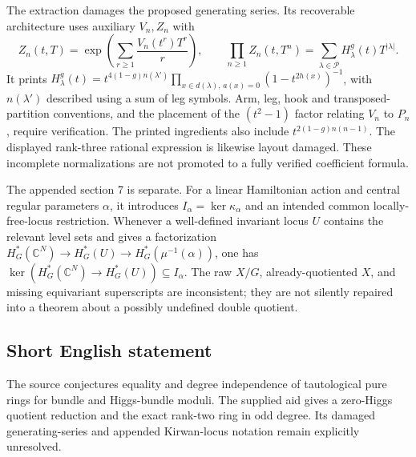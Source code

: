 \documentclass[11pt]{article}
\newcommand{\C}{\mathbb{C}}
\begin{document}
The extraction damages the proposed generating series. Its recoverable architecture uses auxiliary \(V_n,Z_n\) with
\[
Z_n(t,T)=\exp\left(\sum_{r\geq1}\frac{V_n(t^r)T^r}{r}\right),\qquad
\prod_{n\geq1}Z_n(t,T^n)=\sum_{\lambda\in\mathcal P}H^g_\lambda(t)T^{|\lambda|}.
\]
It prints \(H^g_\lambda(t)=t^{4(1-g)n(\lambda')}\prod_{x\in d(\lambda),\,a(x)=0}(1-t^{2h(x)})^{-1}\), with \(n(\lambda')\) described using a sum of leg symbols. Arm, leg, hook and transposed-partition conventions, and the placement of the \((t^2-1)\) factor relating \(V_n\) to \(P_n\), require verification. The printed ingredients also include \(t^{2(1-g)n(n-1)}\). The displayed rank-three rational expression is likewise layout damaged. These incomplete normalizations are not promoted to a fully verified coefficient formula.

The appended section 7 is separate. For a linear Hamiltonian action and central regular parameters \(\alpha\), it introduces \(I_\alpha=\ker\kappa_\alpha\) and an intended common locally-free-locus restriction. Whenever a well-defined invariant locus \(U\) contains the relevant level sets and gives a factorization \(H_G^*(\C^N)\to H_G^*(U)\to H_G^*(\mu^{-1}(\alpha))\), one has \(\ker(H_G^*(\C^N)\to H_G^*(U))\subseteq I_\alpha\). The raw \(X/G\), already-quotiented \(X\), and missing equivariant superscripts are inconsistent; they are not silently repaired into a theorem about a possibly undefined double quotient.
\subsection{Short English statement}
The source conjectures equality and degree independence of tautological pure rings for bundle and Higgs-bundle moduli. The supplied aid gives a zero-Higgs quotient reduction and the exact rank-two ring in odd degree. Its damaged generating-series and appended Kirwan-locus notation remain explicitly unresolved.
\end{document}
